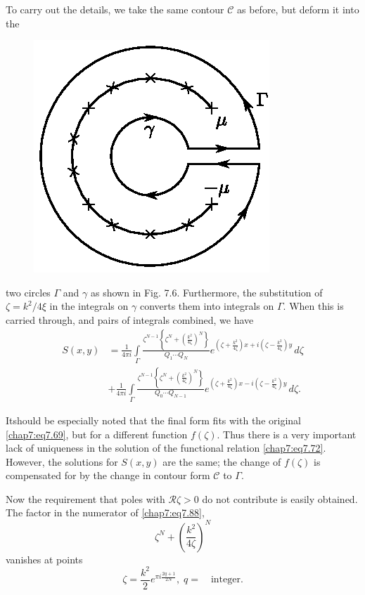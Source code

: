 {{To carry out the details, we take the same contour $\mathscr{C}$ as before, but deform it into the 
\begin{figure}[H]
\centering
\includegraphics{figures/fig61-7.6.eps}
\caption{}
\label{chap1:fig7.6}
\end{figure}
\noindent
two circles $\Gamma$ and $\gamma$ as shown in Fig. 7.6. Furthermore, the substitution of $\zeta=k^2/4\xi$ in the integrals on $\gamma$ converts them into integrals on $\Gamma$. When this is carried through, and pairs of integrals combined, we have 
\begin{align*}
S(x,y) &=\frac{1}{4\pi i}\int\limits_\Gamma\frac{\zeta^{N-1}\left\{\zeta^N+\left( \frac{k^2}{4\zeta}\right)^N\right\}}{Q_1\cdots Q_N} e^{\left(\zeta+\frac{k^2} {4\zeta}\right)x+i\left(\zeta-\frac{k^2}{4\zeta}\right)y}\,d\zeta\\
&+ \frac{1}{4\pi i}\int\limits_\Gamma \frac{\zeta^{N-1}\left\{\zeta^N+\left( \frac{k^2}{4\zeta}\right)^N\right\}}{Q_0\cdots Q_{N-1}} e^{\left(\zeta+\frac{k^2} {4\zeta}\right)x-i\left(\zeta-\frac{k^2}{4\zeta}\right)y}\,d\zeta. \tag{7.88}\label{chap7:eq7.88}
\end{align*}

It\pageoriginale should be especially noted that the final form fits with the original \eqref{chap7:eq7.69}, but for a different function $f(\zeta)$. Thus there is a very important lack of uniqueness in the solution of the functional relation \eqref{chap7:eq7.72}. However, the solutions for $S(x,y)$ are the same; the change of $f(\zeta)$ is compensated for by the change in contour form $\mathscr{C}$ to $\Gamma$.

Now the requirement that poles with $\mathscr{R}\zeta >0$ do not contribute is easily obtained. The factor in the numerator of \eqref{chap7:eq7.88},
\begin{equation}
\zeta^N+\left(\frac{k^2}{4\zeta}\right)^N\tag{7.89}\label{chap7:eq7.89}
\end{equation}
vanishes at points
\begin{equation}
\zeta=\frac{k^2}{2} e^{\pi i\frac{2q+1}{2N}},\; q=\quad\text{integer}. \tag{7.90}\label{chap7:eq7.90}
\end{equation}

}}
